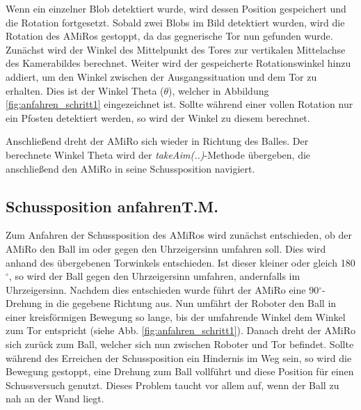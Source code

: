 Wenn ein einzelner Blob detektiert wurde, wird dessen Position gespeichert und die Rotation fortgesetzt. Sobald zwei Blobs im Bild detektiert wurden, wird die Rotation des AMiRos gestoppt, da das gegnerische Tor nun gefunden wurde. Zunächst wird der Winkel des Mittelpunkt des Tores zur vertikalen Mittelachse des Kamerabildes berechnet. Weiter wird der gespeicherte Rotationswinkel hinzu addiert, um den Winkel zwischen der Ausgangssituation und dem Tor zu erhalten. Dies ist der Winkel Theta ($\theta$), welcher in Abbildung \ref{fig:anfahren_schritt1} eingezeichnet ist. 
Sollte während einer vollen Rotation nur ein Pfosten detektiert werden, so wird der Winkel zu diesem berechnet.

Anschließend dreht der AMiRo sich wieder in Richtung des Balles. Der berechnete Winkel Theta wird der \textit{takeAim(..)}-Methode übergeben, die anschließend den AMiRo in seine Schussposition navigiert.


\subsection[Schussposition anfahren]{Schussposition anfahren\hfill {\normalsize T.M.}} %

Zum Anfahren der Schussposition des AMiRos wird zunächst entschieden, ob der AMiRo den Ball im oder gegen den Uhrzeigersinn umfahren soll. Dies wird anhand des übergebenen Torwinkels entschieden. Ist dieser kleiner oder gleich 180$^\circ$, so wird der Ball gegen den Uhrzeigersinn umfahren, andernfalls im Uhrzeigersinn.
Nachdem dies entschieden wurde führt der AMiRo eine 90$^\circ$-Drehung in die gegebene Richtung aus. 
Nun umfährt der Roboter den Ball in einer kreisförmigen Bewegung so lange, bis der umfahrende Winkel dem Winkel zum Tor entspricht (siehe Abb. \ref{fig:anfahren_schritt1}). Danach dreht der AMiRo sich zurück zum Ball, welcher sich nun zwischen Roboter und Tor befindet.
Sollte während des Erreichen der Schussposition ein Hindernis im Weg sein, so wird die Bewegung gestoppt, eine Drehung zum Ball vollführt und diese Position für einen Schussversuch genutzt. Dieses Problem taucht vor allem auf, wenn der Ball zu nah an der Wand liegt.

